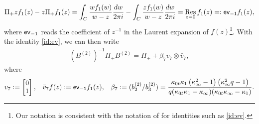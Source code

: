 \documentclass[a4paper,reqno,11pt]{amsart}
\numberwithin{equation}{section}
\numberwithin{figure}{section}
\theoremstyle{plain}
\theoremstyle{remark}
\numberwithin{rhp}{section}
\DeclareMathOperator{\res}{Res}
\begin{document}
\begin{align}\label{id:ev}
     \Pi_{+} z f_1(z) - z  \Pi_{+}f_1(z) = \int_{C} \frac{w f_1(w)}{w-z} \frac{dw}{2\pi i} - \int_{C} \frac{z f_1(w)}{w-z} \frac{dw}{2\pi i} = \res_{z=0} f_1(z) =:{\sf{ev}_{-1}} f_1(z),
\end{align}
where ${\sf ev}_{-1}$ reads the coefficient of $z^{-1}$ in the Laurent expansion of $f(z)$\footnote{Our notation is consistent with the notation of \cite{gavrylenko2025riemannhilbertproblemsfredholmdeterminants} for identities such as \eqref{id:ev}.}. With the identity \eqref{id:ev}, we can then write 
\begin{align}
      (B^{(2)})^{-1} \Pi_{+} B^{(2)} = \Pi_{+} + \beta_7 v_7 \otimes \bar{v}_7, \label{eq:BPi1}
\end{align}
where 
\begin{align}
v_7 := \begin{bmatrix} 0\\ 1   \end{bmatrix}, &&  \bar{v}_7 f(z) := {\sf{ev}_{-1}} f_1(z), && \beta_7 := (b_2^{(2)}/b_3^{(2)}) = \frac{\kappa_{0t} \kappa_{1} \left(\kappa_{\infty}^2-1\right) \left(\kappa_{\infty}^2 q-1\right)}{q (\kappa_{0t} \kappa_{1}-\kappa_{\infty}) (\kappa_{0t} \kappa_{\infty}-\kappa_{1})}. \label{def:beta}
\end{align}
\end{document}
